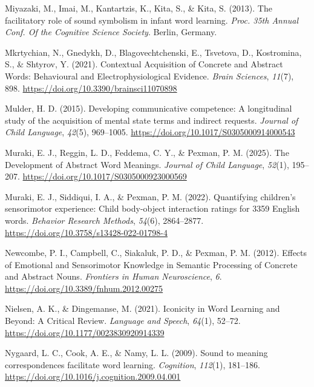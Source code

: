 \documentclass[
  man,floatsintext]{apa6}
\newlength{\cslhangindent}
\newenvironment{CSLReferences}[2] %
 {\begin{list}{}{%
  \setlength{\itemindent}{0pt}
  \setlength{\leftmargin}{0pt}
  \setlength{\parsep}{0pt}
  \ifodd #1
   \setlength{\leftmargin}{\cslhangindent}
   \setlength{\itemindent}{-1\cslhangindent}
  \fi
  \setlength{\itemsep}{#2\baselineskip}}}
 {\end{list}}
\begin{document}
\begin{CSLReferences}{1}{0}
Miyazaki, M., Imai, M., Kantartzis, K., Kita, S., \& Kita, S. (2013). The facilitatory role of sound symbolism in infant word learning. \emph{Proc. 35th {Annual Conf}. Of the {Cognitive Science Society}}. Berlin, Germany.

Mkrtychian, N., Gnedykh, D., Blagovechtchenski, E., Tsvetova, D., Kostromina, S., \& Shtyrov, Y. (2021). Contextual {Acquisition} of {Concrete} and {Abstract Words}: {Behavioural} and {Electrophysiological Evidence}. \emph{Brain Sciences}, \emph{11}(7), 898. \url{https://doi.org/10.3390/brainsci11070898}

Mulder, H. D. (2015). Developing communicative competence: A longitudinal study of the acquisition of mental state terms and indirect requests. \emph{Journal of Child Language}, \emph{42}(5), 969--1005. \url{https://doi.org/10.1017/S0305000914000543}

Muraki, E. J., Reggin, L. D., Feddema, C. Y., \& Pexman, P. M. (2025). The {Development} of {Abstract Word Meanings}. \emph{Journal of Child Language}, \emph{52}(1), 195--207. \url{https://doi.org/10.1017/S0305000923000569}

Muraki, E. J., Siddiqui, I. A., \& Pexman, P. M. (2022). Quantifying children's sensorimotor experience: {Child} body-object interaction ratings for 3359 {English} words. \emph{Behavior Research Methods}, \emph{54}(6), 2864--2877. \url{https://doi.org/10.3758/s13428-022-01798-4}

Newcombe, P. I., Campbell, C., Siakaluk, P. D., \& Pexman, P. M. (2012). Effects of {Emotional} and {Sensorimotor Knowledge} in {Semantic Processing} of {Concrete} and {Abstract Nouns}. \emph{Frontiers in Human Neuroscience}, \emph{6}. \url{https://doi.org/10.3389/fnhum.2012.00275}

Nielsen, A. K., \& Dingemanse, M. (2021). Iconicity in {Word Learning} and {Beyond}: {A Critical Review}. \emph{Language and Speech}, \emph{64}(1), 52--72. \url{https://doi.org/10.1177/0023830920914339}

Nygaard, L. C., Cook, A. E., \& Namy, L. L. (2009). Sound to meaning correspondences facilitate word learning. \emph{Cognition}, \emph{112}(1), 181--186. \url{https://doi.org/10.1016/j.cognition.2009.04.001}


\end{CSLReferences}
\end{document}

